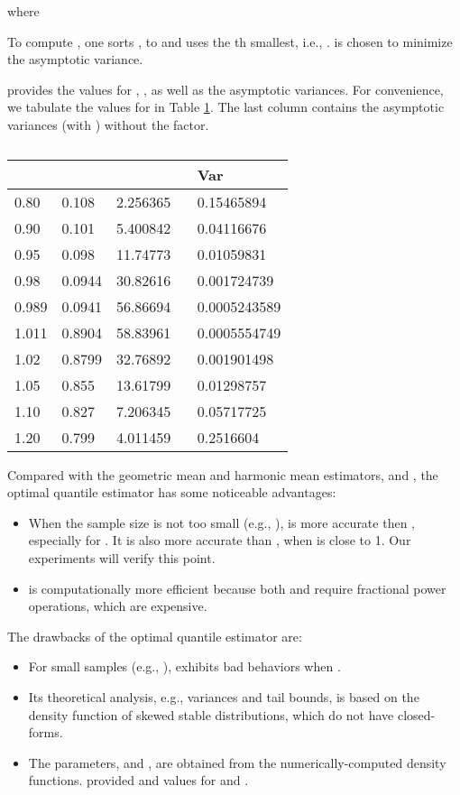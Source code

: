 \documentclass{sig-alternate}
\begin{document}
where


To compute , one sorts ,  to  and uses the th smallest, i.e., .   is chosen to minimize the asymptotic variance.

\cite{Report:Li_CC_oq} provides the values for , , as well as the asymptotic variances. For convenience, we tabulate the values for  in Table \ref{tab_oq}. The last column contains the asymptotic variances (with ) without the  factor.

\begin{table}[h]
\caption{\small
 }
\begin{center}{\scriptsize
\begin{tabular}{l l l l}
\hline \hline
 &  &  &Var\\\hline
0.80 &0.108 &2.256365  &0.15465894  \\
0.90 &0.101 &5.400842 \  &0.04116676 \\
0.95 &0.098 &11.74773 &0.01059831    \\
0.98  & 0.0944 &30.82616 & 0.001724739  \\
0.989 & 0.0941 &56.86694 &0.0005243589 \\
1.011 & 0.8904 &58.83961  &0.0005554749 \\
1.02 & 0.8799 &32.76892  &0.001901498  \\
1.05 & 0.855 &13.61799   &0.01298757 \\
1.10 & 0.827 &7.206345   &0.05717725 \\
1.20 & 0.799 &4.011459   &0.2516604 \\
\hline\hline
\end{tabular}
}
\end{center}
\label{tab_oq}
\end{table}


Compared with the geometric mean and harmonic mean estimators,  and , the optimal quantile estimator  has some noticeable advantages:
\begin{itemize}
\item When the sample size  is not too small (e.g., ),  is more accurate then , especially for . It is also more accurate than , when  is close to 1. Our experiments will verify this point.
\item  is computationally more efficient because both  and  require  fractional power operations, which are expensive.
\end{itemize}

The drawbacks of the optimal quantile estimator are:
\begin{itemize}
\item For small samples (e.g., ),  exhibits bad behaviors when .
\item Its theoretical analysis, e.g., variances and tail bounds, is based on the density function of skewed stable distributions, which do not have closed-forms.
\item The  parameters,  and , are obtained from the numerically-computed density functions. \cite{Report:Li_CC_oq} provided  and  values for  and .
\end{itemize}
\end{document}
